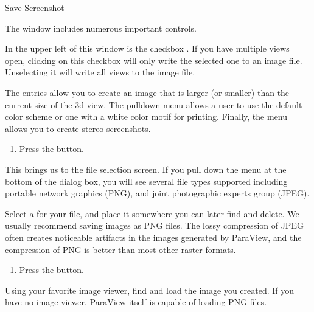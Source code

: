 \begin{exercise}{Save Screenshot}
\begin{enumerate}
  \savecounter
  \end{enumerate}

  The  window includes numerous important controls.  
  
  In the upper left of this window is the checkbox 
  .  If you have multiple views open, 
  clicking on this checkbox will only write the selected one to an image file.
  Unselecting it will write all views to the image file.

  The  entries allow you to
  create an image that is larger (or smaller) than the current size of the
  3d view.  The  pulldown menu allows a user to
  use the default color scheme or one with a white color motif for
  printing.  Finally, the  menu allows you
  to create stereo screenshots.

  \begin{enumerate}
    \restorecounter
    \item Press the  button.
    \savecounter
  \end{enumerate}

  This brings us to the file selection screen.  If you pull down the menu
   at the bottom of the dialog box, you will see
  several file types supported including
  portable network graphics
  (PNG), and joint
  photographic experts group (JPEG).

  Select a  for your file, and place it somewhere you can
  later find and delete.  We usually recommend saving images as PNG
  files.  The lossy compression of JPEG often creates noticeable artifacts
  in the images generated by ParaView, and the compression of PNG is
  better than most other raster formats.

  \begin{enumerate}
    \restorecounter
    \item Press the  button.
  \end{enumerate}

  Using your favorite image viewer, find and load the image you created.
  If you have no image viewer, ParaView itself is capable of loading PNG
  files.
\end{exercise}


